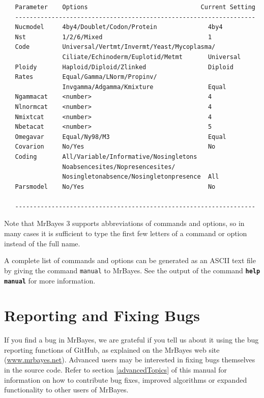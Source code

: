\documentclass[12pt]{book}
\newcommand{\ttt}[1]{\texttt{#1}}
\newcommand{\tb}[1]{\ttt{\textbf{#1}}}
\begin{document}
\begin{singlespacing}
\footnotesize
\begin{verbatim}
   Parameter    Options                               Current Setting
   ------------------------------------------------------------------
   Nucmodel     4by4/Doublet/Codon/Protein              4by4
   Nst          1/2/6/Mixed                             1
   Code         Universal/Vertmt/Invermt/Yeast/Mycoplasma/
                Ciliate/Echinoderm/Euplotid/Metmt       Universal
   Ploidy       Haploid/Diploid/Zlinked                 Diploid
   Rates        Equal/Gamma/LNorm/Propinv/
                Invgamma/Adgamma/Kmixture               Equal
   Ngammacat    <number>                                4
   Nlnormcat    <number>                                4
   Nmixtcat     <number>                                4
   Nbetacat     <number>                                5
   Omegavar     Equal/Ny98/M3                           Equal
   Covarion     No/Yes                                  No
   Coding       All/Variable/Informative/Nosingletons
                Noabsencesites/Nopresencesites/
                Nosingletonabsence/Nosingletonpresence  All
   Parsmodel    No/Yes                                  No

   ------------------------------------------------------------------
\end{verbatim}
\normalsize
\end{singlespacing}

Note that MrBayes 3 supports abbreviations of commands and options, so in many cases it is
sufficient to type the first few letters of a command or option instead of the full name.

A complete list of commands and options can be generated as an ASCII text file by giving the
command \ttt{manual} to MrBayes. See the output of the command \tb{help manual} for more
information.

\section{Reporting and Fixing Bugs}
If you find a bug in MrBayes, we are grateful if you tell us about it using the bug reporting
functions of GitHub, as explained on the MrBayes web site (\url{www.mrbayes.net}).
Advanced users may be interested in fixing bugs themselves in the source code. Refer to section
\ref{advancedTopics} of this manual for information on how to contribute bug fixes, improved
algorithms or expanded functionality to other users of MrBayes.
\end{document}

